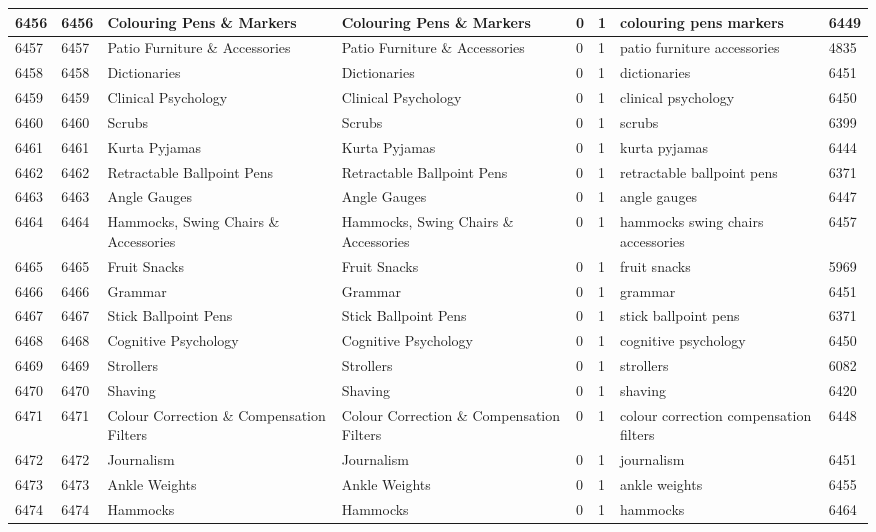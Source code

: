 \begin{longtable}{|l|l|l|l|l|l|l|l|}
6456 & 6456 & Colouring Pens \& Markers & Colouring Pens \& Markers & 0 & 1 & colouring pens markers & 6449 \\ \hline 
6457 & 6457 & Patio Furniture \& Accessories & Patio Furniture \& Accessories & 0 & 1 & patio furniture accessories & 4835 \\ \hline 
6458 & 6458 & Dictionaries & Dictionaries & 0 & 1 & dictionaries & 6451 \\ \hline 
6459 & 6459 & Clinical Psychology & Clinical Psychology & 0 & 1 & clinical psychology & 6450 \\ \hline 
6460 & 6460 & Scrubs & Scrubs & 0 & 1 & scrubs & 6399 \\ \hline 
6461 & 6461 & Kurta Pyjamas & Kurta Pyjamas & 0 & 1 & kurta pyjamas & 6444 \\ \hline 
6462 & 6462 & Retractable Ballpoint Pens & Retractable Ballpoint Pens & 0 & 1 & retractable ballpoint pens & 6371 \\ \hline 
6463 & 6463 & Angle Gauges & Angle Gauges & 0 & 1 & angle gauges & 6447 \\ \hline 
6464 & 6464 & Hammocks, Swing Chairs \& Accessories & Hammocks, Swing Chairs \& Accessories & 0 & 1 & hammocks swing chairs accessories & 6457 \\ \hline 
6465 & 6465 & Fruit Snacks & Fruit Snacks & 0 & 1 & fruit snacks & 5969 \\ \hline 
6466 & 6466 & Grammar & Grammar & 0 & 1 & grammar & 6451 \\ \hline 
6467 & 6467 & Stick Ballpoint Pens & Stick Ballpoint Pens & 0 & 1 & stick ballpoint pens & 6371 \\ \hline 
6468 & 6468 & Cognitive Psychology & Cognitive Psychology & 0 & 1 & cognitive psychology & 6450 \\ \hline 
6469 & 6469 & Strollers & Strollers & 0 & 1 & strollers & 6082 \\ \hline 
6470 & 6470 & Shaving & Shaving & 0 & 1 & shaving & 6420 \\ \hline 
6471 & 6471 & Colour Correction \& Compensation Filters & Colour Correction \& Compensation Filters & 0 & 1 & colour correction compensation filters & 6448 \\ \hline 
6472 & 6472 & Journalism & Journalism & 0 & 1 & journalism & 6451 \\ \hline 
6473 & 6473 & Ankle Weights & Ankle Weights & 0 & 1 & ankle weights & 6455 \\ \hline 
6474 & 6474 & Hammocks & Hammocks & 0 & 1 & hammocks & 6464 \\ \hline 

\end{longtable}
